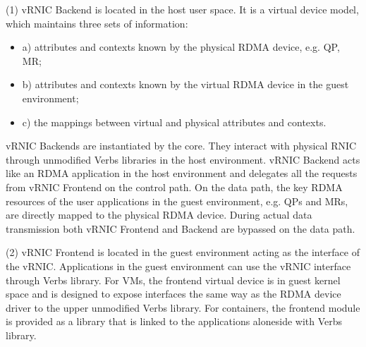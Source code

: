 
(1) vRNIC Backend is located in the host user space. It is a virtual device model, which maintains three sets of information:
\begin{itemize}
	\item a) attributes and contexts known by the physical RDMA device, e.g. QP, MR;
	\item b) attributes and contexts known by the virtual RDMA device in the guest environment;
	\item c) the mappings between virtual and physical attributes and contexts.
\end{itemize}
vRNIC Backends are instantiated by the \sys core. They interact with physical RNIC through unmodified Verbs libraries in the host environment. vRNIC Backend acts like an RDMA application in the host environment and delegates all the requests from vRNIC Frontend on the control path. On the data path, the key RDMA resources of the user applications in the guest environment, e.g. QPs and MRs, are directly mapped to the physical RDMA device. During actual data transmission both vRNIC Frontend and Backend are bypassed on the data path.


(2) vRNIC Frontend is located in the guest environment acting as the interface of the vRNIC. Applications in the guest environment can use the vRNIC interface through Verbs library. For VMs, the frontend virtual device is in guest kernel space and is designed to expose interfaces the same way as the RDMA device driver to the upper unmodified Verbs library. For containers, the frontend module is provided as a library that is linked to the applications aloneside with Verbs library.


